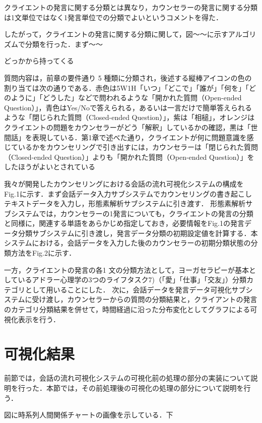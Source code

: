 \documentclass[shuuron]{kuee}
\begin{document}
クライエントの発言に関する分類とは異なり，カウンセラーの発言に関する分類は1文単位ではなく1発言単位での分類でよいというコメントを得た．

したがって，クライエントの発言に関する分類に関して，図〜〜に示すアルゴリズムで分類を行った．まず〜〜

どっかから持ってくる


質問内容は，前章の要件通り 5 種類に分類され，後述する縦棒アイコンの色の割り当ては次の通りである．赤色は5W1H「いつ」「どこで」「誰が」「何を」「どのように」「どうした」などで問われるような「開かれた質問（Open-ended Question）」，青色はYes/Noで答えられる，あるいは一言だけで簡単答えられるような「閉じられた質問（Closed-ended Question）」，紫は「相槌」，オレンジはクライエントの問題をカウンセラーがどう「解釈」しているかの確認，黒は「世間話」を表現している．第1章で述べた通り，クライエントが何に問題意識を感じているかをカウンセリングで引き出すには，カウンセラーは「閉じられた質問（Closed-ended Question）」よりも「開かれた質問（Open-ended Question）」をしたほうがよいとされている

我々\cite{uetsuji}が開発したカウンセリングにおける会話の流れ可視化システムの構成をFig.1に示す．まず会話データ入力サブシステムでカウンセリングの書き起こしテキストデータを入力し，形態素解析サブシステムに引き渡す．
形態素解析サブシステムでは，カウンセラーの1発言についても，クライエントの発言の分類と同様に，関連する単語をあらかじめ指定しておき，必要情報をFig.1の発言データ分類サブシステムに引き渡し，発言データ分類の初期設定値を計算する．本システムにおける，会話データを入力した後のカウンセラーの初期分類状態の分類方法をFig.2に示す．


一方，クライエントの発言の各1 文の分類方法として，ヨーガセラピーが基本としているアドラー心理学の3つのライフタスク7)（「愛」「仕事」「交友」）分類カテゴリとして用いることにした．
次に，会話データを発言データ可視化サブシステムに受け渡し，カウンセラーからの質問の分類結果と，クライアントの発言のカテゴリ分類結果を併せて，時間経過に沿った分布変化としてグラフによる可視化表示を行う．


\section{可視化結果}

前節では，会話の流れ可視化システムの可視化前の処理の部分の実装について説明を行った．本節では，その前処理後の可視化の処理の部分について説明を行う．



図に時系列人間関係チャートの画像を示している．下
\end{document}
